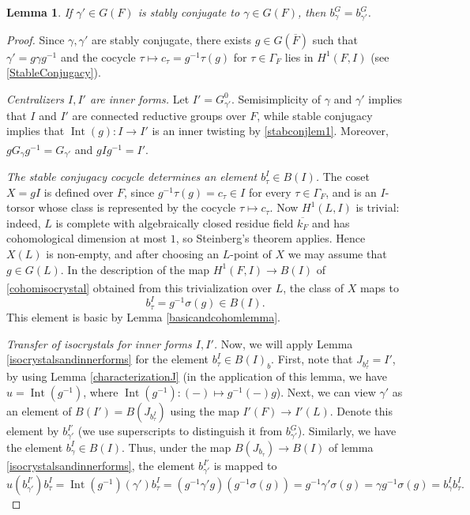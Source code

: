 \documentclass[11pt,a4paper]{article}
\theoremstyle{definition}
\theoremstyle{plain}
\newtheorem{Le}[shared]{Lemma}
\theoremstyle{remark}
\theoremstyle{plain}
\DeclareMathOperator{\Int}{Int}
\begin{document}
\begin{Le}\label{isocrystalstableconj}
    If $\gamma' \in G(F)$ is stably conjugate to $\gamma \in G(F)$, then $b_{\gamma}^G = b_{\gamma'}^G$.
\end{Le}
\begin{proof}
    Since $\gamma, \gamma'$ are stably conjugate, there exists $g \in G(\overline{F})$ such that $\gamma' = g \gamma g^{-1}$ and the cocycle $\tau \mapsto c_{\tau} = g^{-1} \tau (g)$ for $\tau \in \Gamma_F$ lies in $H^1(F,I)$ (see \ref{StableConjugacy}).
    
    \textit{Centralizers $I, I'$ are inner forms.} Let $I' = G_{\gamma'}^0$. Semisimplicity of $\gamma$ and $\gamma'$ implies that $I$ and $I'$ are connected reductive groups over $F$, while stable conjugacy implies that $\Int(g):I \xrightarrow[]{} I'$ is an inner twisting by \ref{stabconjlem1}. Moreover, $gG_{\gamma}g^{-1}=G_{\gamma'}$ and $gIg^{-1}=I'$.

    \textit{The stable conjugacy cocycle determines an element $b_{\tau}^I \in B(I)$.} The coset $X=gI$ is defined over $F$, since $g^{-1}\tau(g)=c_\tau\in I$ for every $\tau\in\Gamma_F$, and is an $I$-torsor whose class is represented by the cocycle $\tau\mapsto c_\tau$. Now $H^1(L,I)$ is trivial: indeed, $L$ is complete with algebraically closed residue field $\overline{k_F}$ and has cohomological dimension at most $1$, so Steinberg's theorem applies. Hence $X(L)$ is non-empty, and after choosing an $L$-point of $X$ we may assume that $g\in G(L)$. In the description of the map $H^1(F,I)\xrightarrow[]{}B(I)$ of \ref{cohomisocrystal} obtained from this trivialization over $L$, the class of $X$ maps to
    $$b_\tau^I=g^{-1}\sigma(g)\in B(I).$$
    This element is basic by Lemma \ref{basicandcohomlemma}.
    
    \textit{Transfer of isocrystals for inner forms $I,I'$.} Now, we will apply Lemma \ref{isocrystalsandinnerforms} for the element $b_{\tau}^I \in B(I)_b$. First, note that $J_{b_{\tau}^I} = I'$, by using Lemma \ref{characterizationJ} (in the application of this lemma, we have $u = \Int(g^{-1})$, where $\Int(g^{-1}): (-) \mapsto g^{-1}(-)g$). Next, we can view $\gamma'$ as an element of $B(I') = B(J_{b_{\tau}^I})$ using the map $I'(F) \xrightarrow[]{} I'(L)$. Denote this element by $b_{\gamma'}^{I'}$ (we use superscripts to distinguish it from $b_{\gamma'}^G$). Similarly, we have the element $b_{\gamma}^I \in B(I)$. Thus, under the map $B(J_{b_{\tau}}) \xrightarrow[]{} B(I)$ of lemma \ref{isocrystalsandinnerforms}, the element $b_{\gamma'}^{I'}$ is mapped to
    $$ u(b_{\gamma'}^{I'}) b_{\tau}^I = \Int(g^{-1}) (\gamma') b_{\tau}^I = (g^{-1} \gamma' g) (g^{-1} \sigma(g)) = g^{-1} \gamma' \sigma(g) = \gamma g^{-1} \sigma(g) = b_{\gamma}^Ib_{\tau}^I.$$


\end{proof}
\end{document}
